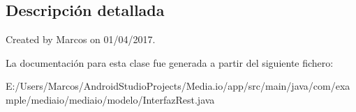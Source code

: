 \subsection{Descripción detallada}
Created by Marcos on 01/04/2017. 

La documentación para esta clase fue generada a partir del siguiente fichero\+:\begin{DoxyCompactItemize}
\item 
E\+:/\+Users/\+Marcos/\+Android\+Studio\+Projects/\+Media.\+io/app/src/main/java/com/example/mediaio/mediaio/modelo/Interfaz\+Rest.\+java\end{DoxyCompactItemize}
